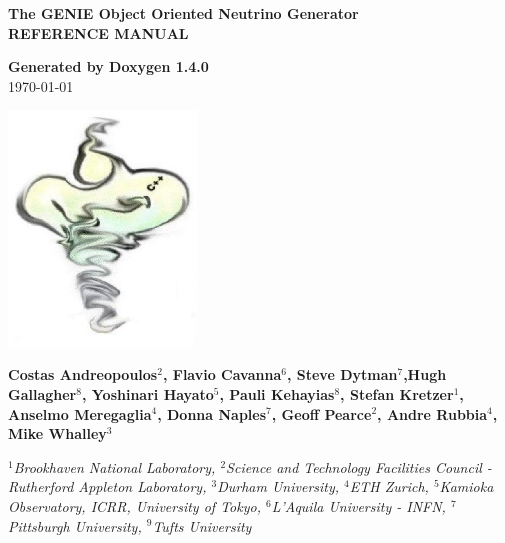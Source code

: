 \documentclass[a4paper]{book}
\begin{document}
\begin{titlepage}
\vspace*{3cm}
\begin{center}

{\Large \textbf{The GENIE Object Oriented Neutrino Generator}}\\
\vspace*{1cm}
{\Large \textbf{REFERENCE MANUAL}}\\
\vspace*{1cm}

{\large \textbf{Generated by Doxygen 1.4.0}}\\
\vspace*{0.5cm}
{\large \today}\\
\vspace*{1cm}

\includegraphics[width=5cm,keepaspectratio]{../../data/logo/genie_logo.eps}

\vspace*{0.6cm}

{\textbf{Costas Andreopoulos$^{2}$, Flavio Cavanna$^{6}$, Steve Dytman$^{7}$,Hugh Gallagher$^{8}$,
Yoshinari Hayato$^{5}$, Pauli Kehayias$^{8}$, Stefan Kretzer$^{1}$, Anselmo Meregaglia$^{4}$,
Donna Naples$^{7}$, Geoff Pearce$^{2}$, Andre Rubbia$^{4}$, Mike Whalley$^{3}$}}\\
\vspace*{0.5cm}

{\textit{
$^{1}$Brookhaven National Laboratory, 
$^{2}$Science and Technology Facilities Council - Rutherford Appleton Laboratory,
$^{3}$Durham University, 
$^{4}$ETH Zurich, 
$^{5}$Kamioka Observatory, ICRR, University of Tokyo, 
$^{6}$L'Aquila University - INFN, 
$^{7}$Pittsburgh University, $^{9}$Tufts University}}

\end{center}
\end{titlepage}
\clearemptydoublepage
{}
\tableofcontents
\clearemptydoublepage
{}
\end{document}
